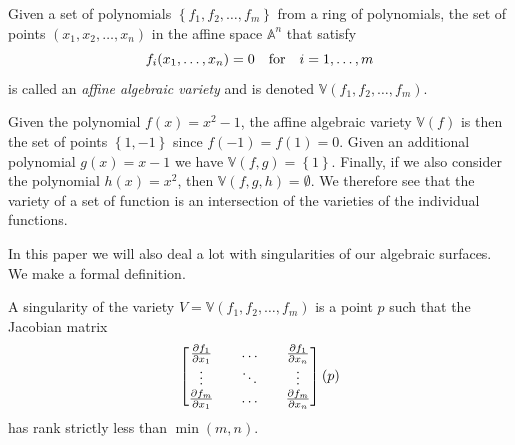 \documentclass{article}
\newcommand{\A}{\mathbb{A}}
\newcommand{\V}{\mathbb{V}}
\begin{document}
\begin{definition}
    Given a set of polynomials $\left\{ f_1, f_2, \ldots, f_m \right\}$ from a ring
    of polynomials, the set of points $(x_1, x_2, \ldots, x_n)$ in the affine space
    $\A^n$ that satisfy
    \begin{equation}
        \notag
        f_i(x_1, \ldots, x_n) = 0 \quad \text{for} \quad i = 1, \ldots, m
    \end{equation}
    is called an \emph{affine algebraic variety} and is denoted $\V(f_1, f_2,
    \ldots, f_m)$.
\end{definition}

Given the polynomial $f(x) = x^2 - 1$, the affine algebraic variety $\V(f)$ is
then the set of points $\left\{ 1, -1 \right\}$ since $f(-1) = f(1) = 0$.
Given an additional polynomial $g(x) = x-1$ we have $\V(f, g) = \left\{ 1
\right\}$. Finally, if we also consider the polynomial $h(x) = x^2$, then
$\V(f, g, h) = \emptyset$. We therefore see that the variety of a set of
function is an intersection of the varieties of the individual functions.

In this paper we will also deal a lot with singularities of our algebraic
surfaces. We make a formal definition.
\begin{definition}[Singularity]
    A singularity of the variety $V = \V(f_1, f_2, \ldots, f_m)$ is a point $p$ such
    that the Jacobian matrix
    \begin{equation}
        \notag
        \begin{bmatrix}
            \frac{\partial f_1}{\partial x_1} && \hdots && \frac{\partial f_1}{\partial x_n} \\
            \vdots && \ddots && \vdots \\
            \frac{\partial f_m}{\partial x_1} && \hdots && \frac{\partial f_m}{\partial x_n}
        \end{bmatrix}(p)
    \end{equation} has rank strictly less than $\min(m, n)$.
\end{definition}
\end{document}
